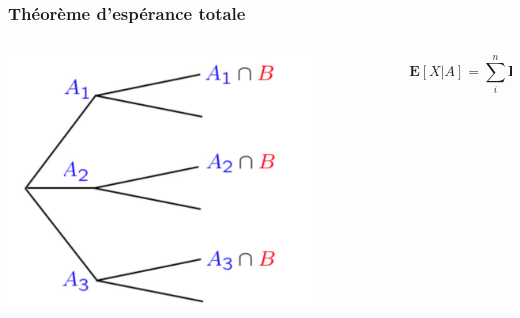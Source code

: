 \documentclass{beamer}
\renewcommand{\P}{\mathbf{P}}
\newcommand{\E}{\mathbf{E}}
\begin{document}
\begin{frame}[t]
  \frametitle{Théorème d'espérance totale}
 \begin{columns}
   \begin{column}{0.4\textwidth}
      \centering
      \includegraphics[width=0.8\textwidth]{./total_expectation.png}
      \pause
      
   \end{column}
   \begin{column}{0.6\textwidth}
     \scriptsize
   {
     \vspace*{1cm}
     \begin{tcolorbox}[title=Espérance totale]
       \scriptsize
      $$
      \E[X|A] = \sum_i^n \P(A_i)\E[X|A_i]
      $$
     \end{tcolorbox}
     
   }
   \end{column}
 \end{columns} 
\end{frame}
\end{document}
